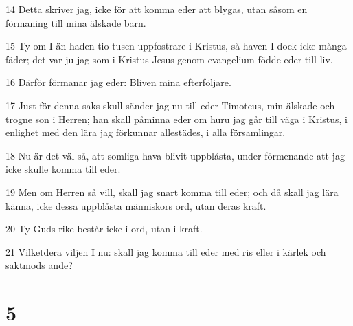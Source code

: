 \par 14 Detta skriver jag, icke för att komma eder att blygas, utan såsom en förmaning till mina älskade barn.
\par 15 Ty om I än haden tio tusen uppfostrare i Kristus, så haven I dock icke många fäder; det var ju jag som i Kristus Jesus genom evangelium födde eder till liv.
\par 16 Därför förmanar jag eder: Bliven mina efterföljare.
\par 17 Just för denna saks skull sänder jag nu till eder Timoteus, min älskade och trogne son i Herren; han skall påminna eder om huru jag går till väga i Kristus, i enlighet med den lära jag förkunnar allestädes, i alla församlingar.
\par 18 Nu är det väl så, att somliga hava blivit uppblåsta, under förmenande att jag icke skulle komma till eder.
\par 19 Men om Herren så vill, skall jag snart komma till eder; och då skall jag lära känna, icke dessa uppblåsta människors ord, utan deras kraft.
\par 20 Ty Guds rike består icke i ord, utan i kraft.
\par 21 Vilketdera viljen I nu: skall jag komma till eder med ris eller i kärlek och saktmods ande?

\chapter{5}

